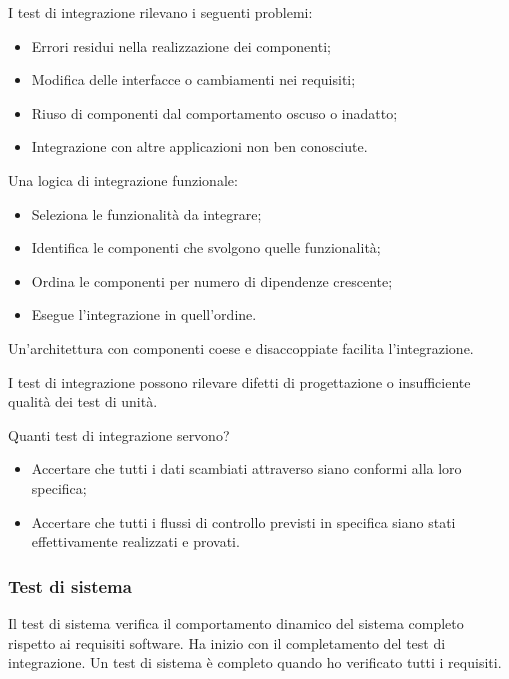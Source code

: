 I test di integrazione rilevano i seguenti problemi:

\begin{itemize}
  \item Errori residui nella realizzazione dei componenti;
  \item Modifica delle interfacce o cambiamenti nei requisiti;
  \item Riuso di componenti dal comportamento oscuso o inadatto;
  \item Integrazione con altre applicazioni non ben conosciute.
\end{itemize}

Una logica di integrazione funzionale:

\begin{itemize}
  \item Seleziona le funzionalità da integrare;
  \item Identifica le componenti che svolgono quelle funzionalità;
  \item Ordina le componenti per numero di dipendenze crescente;
  \item Esegue l'integrazione in quell'ordine.
\end{itemize}

Un'architettura con componenti coese e disaccoppiate facilita l'integrazione.

I test di integrazione possono rilevare difetti di progettazione o insufficiente
qualità dei test di unità.

Quanti test di integrazione servono?

\begin{itemize}
  \item Accertare che tutti i dati scambiati attraverso  siano conformi alla loro specifica;
  \item Accertare che tutti i flussi di controllo previsti in specifica siano
    stati effettivamente realizzati e provati.
\end{itemize}

\subsubsection{Test di sistema}
\label{ssub:test_di_sistema}

Il test di sistema verifica il comportamento dinamico del sistema completo
rispetto ai requisiti software. Ha inizio con il completamento del test di
integrazione. Un test di sistema è completo quando ho verificato tutti i
requisiti.

